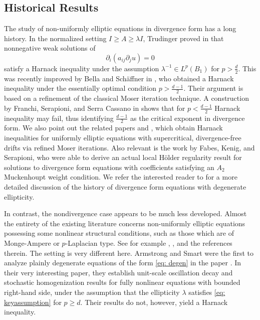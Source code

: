 \documentclass[reqno]{amsart}
\numberwithin{equation}{section}
\numberwithin{equation}{section}
\newcounter{case}
\begin{document}
\subsection{Historical Results}

The study of non-uniformly elliptic equations in divergence form has a long history. 
In the normalized setting $I \ge A \ge \lambda I$, Trudinger proved in \cite{Trudinger1971} 
that nonnegative weak solutions of
\[
\partial_i(a_{ij}\partial_j u)=0
\]
satisfy a Harnack inequality under the assumption $\lambda^{-1}\in L^p(B_1)$ for 
$p>\frac d2$. This was recently improved by Bella and Sch\"affner in \cite{BellaSchaeffner2021}, 
who obtained a Harnack inequality under the essentially optimal condition 
$p>\frac{d-1}{2}$. Their argument is based on a refinement of the classical Moser iteration technique. A construction by Franchi, Serapioni, and Serra Cassano in \cite{FranchiSerapioniCassano1998} shows that for $p<\frac{d-1}{2}$ Harnack inequality may fail, thus identifying $\frac{d-1}{2}$ as the critical exponent in divergence form. We also point out the related papers \cite{AlbrittonDong2023} and \cite{IgnatovaKukavicaRyzhik2014}, which obtain Harnack inequalities for uniformly elliptic equations with supercritical, divergence-free drifts via refined Moser iterations. Also relevant is the work \cite{FabesKenigSerapioni1982} by Fabes, Kenig, and Serapioni, who were able to derive an actual local H{\"o}lder regularity result for solutions to  divergence form equations with coefficients satisfying an $A_2$ Muckenhoupt weight condition. We refer the interested reader to \cite{BellaSchaeffner2021} for a more detailed discussion of the history of divergence form equations with degenerate ellipticity.

In contrast, the nondivergence case appears to be much less developed. Almost the entirety of the existing literature concerns non-uniformly elliptic equations possessing some nonlinear structural conditions, such as those which are of Monge-Ampere or $p$-Laplacian type. See for example \cite{CaffarelliGutierrez1997}, \cite{ImbertSilvestre2016}, and the references therein. The setting is very different here. Armstrong and Smart were the first to analyze plainly degenerate equations of the form \eqref{eq: degen} in the paper \cite{ArmstrongSmart2014}. In their very interesting paper, they establish unit-scale oscillation decay and stochastic homogenization results for fully nonlinear equations with bounded right-hand side, under the assumption that the ellipticity $\lambda$ satisfies \eqref{eq: keyassumption} for $p\ge d$. Their results do not, however, yield a Harnack inequality. 
\end{document}
